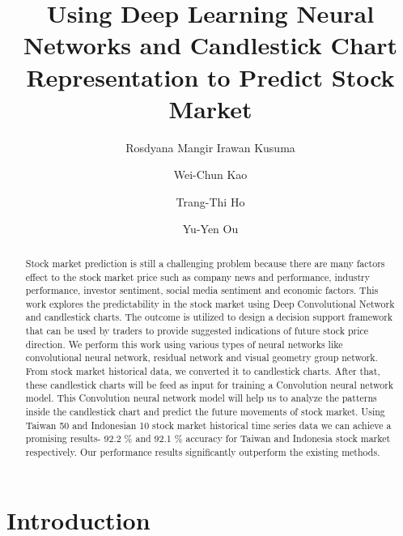 \documentclass[10pt,twocolumn]{article}
\begin{document}
\title{Using Deep Learning Neural Networks and Candlestick Chart Representation to Predict Stock Market}



\author[1]{Rosdyana Mangir Irawan Kusuma}
\author[2]{Wei-Chun Kao}
\author[3]{Trang-Thi Ho}
\author[1]{Yu-Yen Ou}
\renewcommand\Authands{ and }

\maketitle
\thispagestyle{empty}

\begin{abstract}
Stock market prediction is still a challenging problem because there are many factors effect to the stock market price such as company news and performance, industry performance, investor sentiment, social media sentiment and economic factors. This work explores the predictability in the stock market using Deep Convolutional Network and candlestick charts. The outcome is utilized to design a decision support framework that can be used by traders to provide suggested indications of future stock price direction. We perform this work using various types of neural networks like convolutional neural network, residual network and visual geometry group network. From stock market historical data, we converted it to candlestick charts. After that, these candlestick charts will be feed as input for training a Convolution neural network model. This Convolution neural network model will help us to analyze the patterns inside the candlestick chart and predict the future movements of stock market. Using Taiwan 50 and Indonesian 10 stock market historical time series data we can achieve a promising results- 92.2 \% and 92.1 \% accuracy for Taiwan and Indonesia stock market respectively. Our performance results significantly outperform the existing methods.
\end{abstract}


\section{Introduction}
\end{document}
